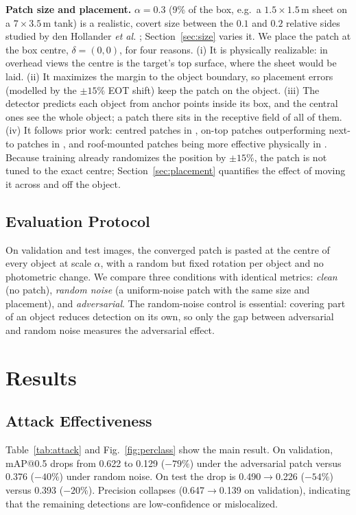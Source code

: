 \documentclass[conference]{IEEEtran}
\begin{document}
\textbf{Patch size and placement.} $\alpha=0.3$ (9\% of the box, e.g.\ a
$1.5\times1.5$\,m sheet on a $7\times3.5$\,m tank) is a realistic, covert size between the
$0.1$ and $0.2$ relative sides studied by den Hollander \emph{et al.}
\cite{denhollander2020adversarial}; Section~\ref{sec:size} varies it. We place the patch at the
box centre, $\delta=(0,0)$, for four reasons. (i) It is physically realizable: in overhead
views the centre is the target's top surface, where the sheet would be laid. (ii) It
maximizes the margin to the object boundary, so placement errors (modelled by the $\pm15\%$
EOT shift) keep the patch on the object. (iii) The detector predicts each object from anchor
points inside its box, and the central ones see the whole object; a patch there sits in the
receptive field of all of them. (iv) It follows prior work: centred patches in
\cite{thys2019fooling}, on-top patches outperforming next-to patches in
\cite{denhollander2020adversarial}, and roof-mounted patches being more effective physically
in \cite{du2022physical}. Because training already randomizes the position by $\pm15\%$, the
patch is not tuned to the exact centre; Section~\ref{sec:placement} quantifies the effect of
moving it across and off the object.

\subsection{Evaluation Protocol}
On validation and test images, the converged patch is pasted at the centre of every object
at scale $\alpha$, with a random but fixed rotation per object and no photometric change.
We compare three conditions with identical metrics: \emph{clean} (no patch),
\emph{random noise} (a uniform-noise patch with the same size and placement), and
\emph{adversarial}. The random-noise control is essential: covering part of an object
reduces detection on its own, so only the gap between adversarial and random noise measures
the adversarial effect.

\section{Results}
\subsection{Attack Effectiveness}
\label{sec:attackres}
Table~\ref{tab:attack} and Fig.~\ref{fig:perclass} show the main result. On validation,
mAP@0.5 drops from 0.622 to 0.129 ($-79\%$) under the adversarial patch versus 0.376
($-40\%$) under random noise. On test the drop is 0.490$\to$0.226 ($-54\%$) versus 0.393
($-20\%$). Precision collapses (0.647$\to$0.139 on validation), indicating that the
remaining detections are low-confidence or mislocalized.
\end{document}
